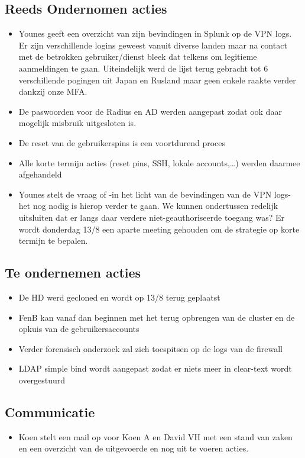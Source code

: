 \documentclass[11pt]{article}
\begin{document}
\subsection{Reeds Ondernomen acties}
\label{sec:org5e36bef}
\begin{itemize}
\item Younes geeft een overzicht van zijn bevindingen in Splunk op de VPN logs. Er zijn verschillende logins geweest vanuit diverse landen maar na contact met de betrokken gebruiker/dienst bleek dat telkens om legitieme aanmeldingen te gaan. Uiteindelijk werd de lijst terug gebracht tot 6 verschillende pogingen uit Japan en Rusland maar geen enkele raakte verder dankzij onze MFA.
\item De paswoorden voor de Radius en AD werden aangepast zodat ook daar mogelijk misbruik uitgesloten is.
\item De reset van de gebruikerspins is een voortdurend proces
\item Alle korte termijn acties (reset pins, SSH, lokale accounts,\ldots{}) werden daarmee afgehandeld
\item Younes stelt de vraag of -in het licht van de bevindingen van de VPN logs- het nog nodig is hierop verder te gaan. We kunnen ondertussen redelijk uitsluiten dat er langs daar verdere niet-geauthoriseerde toegang was? Er wordt donderdag 13/8 een aparte meeting gehouden om de strategie op korte termijn te bepalen.
\end{itemize}

\subsection{Te ondernemen acties}
\label{sec:org3e6aa51}
\begin{itemize}
\item De HD werd gecloned en wordt op 13/8 terug geplaatst
\item FenB kan vanaf dan beginnen met het terug opbrengen van de cluster en de opkuis van de gebruikersaccounts
\item Verder forensisch onderzoek zal zich toespitsen op de logs van de firewall
\item LDAP simple bind wordt aangepast zodat er niets meer in clear-text wordt overgestuurd
\end{itemize}

\subsection{Communicatie}
\label{sec:orgb192014}
\begin{itemize}
\item Koen stelt een mail op voor Koen A en David VH met een stand van zaken en een overzicht van de uitgevoerde en nog uit te voeren acties.
\end{itemize}
\end{document}
